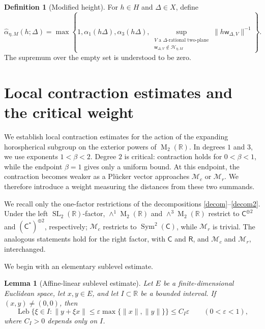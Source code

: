 \documentclass[reqno,11pt]{amsart}
\newtheorem{lem}[lem]{Lemma}
\theoremstyle{definition}
\newtheorem{defn}[defn]{Definition}
\theoremstyle{remark}
\numberwithin{equation}{section}
\newcommand{\M}{\operatorname{M}}
\newcommand{\SL}{\operatorname{SL}}
\newcommand{\Leb}{\operatorname{Leb}}
\begin{document}
\begin{defn}[Modified height]\label{def:modified-height-d2}
For $h\in H$ and $\Delta\in X$, define
$$
\widehat\alpha_{\eta,M}(h;\Delta)
=
\max\left\{
1,
\alpha_1(h\Delta),
\alpha_3(h\Delta),
\sup_{\substack{V\text{ a $\Delta$-rational two-plane}\\
\mathsf w_{\Delta,V}\notin\mathcal H_{\eta,M}}}
\|h\mathsf w_{\Delta,V}\|^{-1}
\right\}.
$$
The supremum over the empty set is understood to be zero.
\end{defn}

\section{Local contraction estimates and the critical weight}
\label{sec:local-d2}
We establish local contraction estimates for the action of the expanding
horospherical subgroup on the exterior powers of $\M_2(\mathbb R)$. In
degrees $1$ and $3$, we use exponents $1<\beta<2$. Degree $2$ is
critical: contraction holds for $0<\beta<1$, while the endpoint $\beta=1$
gives only a uniform bound. At this endpoint, the contraction becomes
weaker as a Pl\"ucker vector approaches $\mathcal M_c$ or $\mathcal M_r$.
We therefore introduce a weight measuring the distances from these two
summands.

We recall only the one-factor restrictions of the decompositions
\eqref{decom}--\eqref{decom2}. Under the left $\SL_2(\mathbb R)$-factor,
$\wedge^1\M_2(\mathbb R)$ and $\wedge^3\M_2(\mathbb R)$ restrict to
$\mathsf C^{\oplus2}$ and $(\mathsf C^*)^{\oplus2}$, respectively;
$\mathcal M_c$ restricts to $\operatorname{Sym}^2(\mathsf C)$, while
$\mathcal M_r$ is trivial. The analogous statements hold for the right
factor, with $\mathsf C$ and $\mathsf R$, and $\mathcal M_c$ and
$\mathcal M_r$, interchanged.



We begin with an elementary sublevel estimate. 
\begin{lem}[Affine-linear sublevel estimate]
\label{lem:linear-sublevel}
Let $E$ be a finite-dimensional Euclidean space, let $x,y\in E$, and let
$I\subset\mathbb R$ be a bounded interval. If $(x,y)\ne(0,0)$, then
$$
\Leb\{\xi\in I:
\|y+\xi x\|\le\varepsilon\max\{\|x\|,\|y\|\}\}
\le C_I\varepsilon
\qquad
(0<\varepsilon<1),
$$
where $C_I>0$ depends only on $I$.
\end{lem}
\end{document}
